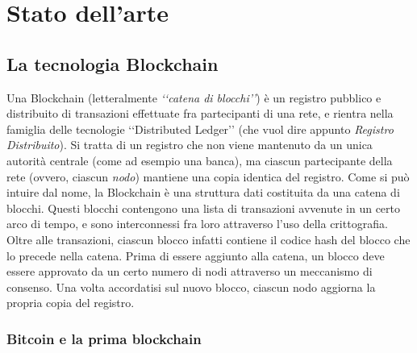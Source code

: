 \chapter{Stato dell'arte}
\lhead[\fancyplain{}{\bfseries\thepage}]{\fancyplain{}{\bfseries\rightmark}}
\section{La tecnologia Blockchain}
Una Blockchain (letteralmente \textit{‘‘catena di blocchi’’}) è un registro pubblico e distribuito di transazioni effettuate fra partecipanti di una rete, e rientra nella famiglia delle tecnologie ‘‘Distributed Ledger’’ (che vuol dire appunto \textit{Registro Distribuito}). Si tratta di un registro che non viene mantenuto da un unica autorità centrale (come ad esempio una banca), ma ciascun partecipante della rete (ovvero, ciascun \textit{nodo}) mantiene una copia identica del registro. Come si può intuire dal nome, la Blockchain è una struttura dati costituita da una catena di blocchi. Questi blocchi contengono una lista di transazioni avvenute in un certo arco di tempo, e sono interconnessi fra loro attraverso l'uso della crittografia. Oltre alle transazioni, ciascun blocco infatti contiene il codice hash del blocco che lo precede nella catena. Prima di essere aggiunto alla catena, un blocco deve essere approvato da un certo numero di nodi attraverso un meccanismo di consenso. Una volta accordatisi sul nuovo blocco, ciascun nodo aggiorna la propria copia del registro.

\subsection{Bitcoin e la prima blockchain}

